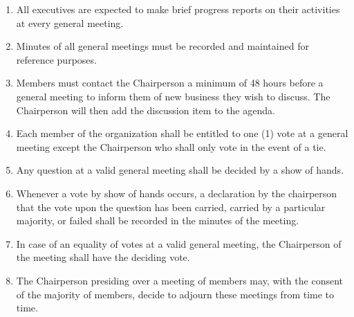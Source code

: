 \documentclass[12pt]{article}
\begin{document}
\begin{enumerate}[{7}.1]
    \item All executives are expected to make brief progress reports on their activities at every general meeting.
    \item Minutes of all general meetings must be recorded and maintained for reference purposes. 
    \item Members must contact the Chairperson a minimum of 48 hours before a general meeting to inform them of new business they wish to discuss. The Chairperson will then add the discussion item to the agenda.
    \item Each member of the organization shall be entitled to one (1) vote at a general meeting except the Chairperson who shall only vote in the event of a tie. 
    \item Any question at a valid general meeting shall be decided by a show of hands. 
    \item Whenever a vote by show of hands occurs, a declaration by the chairperson that the vote upon the question has been carried, carried by a particular majority, or failed shall be recorded in the minutes of the meeting.
    \item In case of an equality of votes at a valid general meeting, the Chairperson of the meeting shall have the deciding vote. 
    \item The Chairperson presiding over a meeting of members may, with the consent of the majority of members, decide to adjourn these meetings from time to time.
\end{enumerate}


\end{document}
